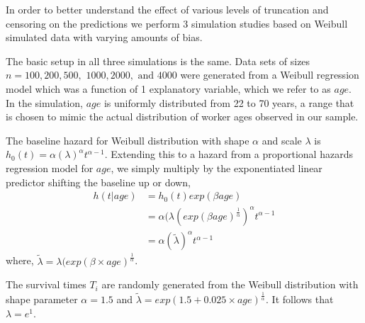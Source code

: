\documentclass[12pt,letterpaper]{article}
\begin{document}
In order to better understand the effect of various levels of truncation and censoring on the predictions we perform 3 simulation studies based on Weibull simulated data with varying amounts of bias.

The basic setup in all three simulations is the same. Data sets of sizes $n =100, 200, 500,$ $1000, 2000,$ $\text{and } 4000$ were generated from a Weibull regression model which was a function of 1 explanatory variable, which we refer to as $age$.  In the simulation, $age$ is uniformly distributed from 22 to 70 years, a range that is chosen to mimic the actual distribution of worker ages observed in our sample.

The baseline hazard for Weibull distribution with shape $\alpha$ and scale $\lambda$ is $h_0(t)=\alpha(\lambda)^\alpha t^{\alpha-1}$.  Extending this to a hazard from a proportional hazards regression model for $age$, we simply multiply by the exponentiated linear predictor shifting the baseline up or down,
\begin{equation} \label{eq:weibull}
\begin{split}%
h(t|age) & =h_0(t)exp(\beta age) \\
&=\alpha (\lambda (exp(\beta age)^{\frac{1}{\alpha}})^\alpha t^{\alpha-1} \\
&=\alpha(\tilde{\lambda} )^\alpha t^{\alpha-1}
\end{split}
\end{equation}
where, $\tilde{\lambda}=\lambda (exp(\beta \times age)^{\frac{1}{\alpha}}$.

The survival times $T_i$ are randomly generated from the Weibull distribution with shape parameter $\alpha=1.5$ and $\tilde{\lambda}=exp(1.5 +0.025 \times age)^{\frac{1}{\alpha}}$.  It follows that $\lambda = e^1$.
\end{document}
